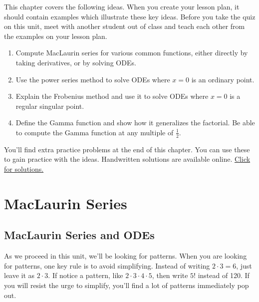 

This chapter covers the following ideas. When you create your lesson plan, it should contain examples which illustrate these key ideas. Before you take the quiz on this unit, meet with another student out of class and teach each other from the examples on your lesson plan. 

\begin{enumerate}
\item Compute MacLaurin series for various common functions, either directly by taking derivatives, or by solving ODEs.
\item Use the power series method to solve ODEs where $x=0$ is an ordinary point.
\item Explain the Frobenius method and use it to solve ODEs where $x=0$ is a regular singular point.
\item Define the Gamma function and show how it generalizes the factorial. Be able to compute the Gamma function at any multiple of $\frac{1}{2}$. 
\end{enumerate}

You'll find extra practice problems at the end of this chapter.  You can use these to gain practice with the ideas.  Handwritten solutions are available online.  \href{https://content.byui.edu/file/664390b8-e9cc-43a4-9f3c-70362f8b9735/1/08-Power-Series-Preparation-Solutions.pdf}{Click for solutions.}

\section{MacLaurin Series}

\subsection{MacLaurin Series and ODEs}
As we proceed in this unit, we'll be looking for patterns.  When you are looking for patterns, one key rule is to avoid simplifying.  Instead of writing $2\cdot 3=6$, just leave it as $2\cdot 3$.  If notice a pattern, like $2\cdot 3\cdot 4 \cdot 5$, then write $5!$ instead of 120. If you will resist the urge to simplify, you'll find a lot of patterns immediately pop out.  

